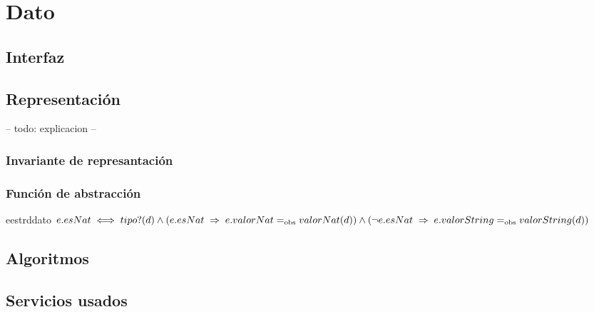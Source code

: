 \section{Dato}

\subsection{Interfaz}

\iusa{}

\ioperaciones

\subsection{Representación}

-- todo: explicacion --


\subsubsection{Invariante de represantación}


\subsubsection{Función de abstracción}

\begin{ABS}{e}{estr}{d}{dato}
    $
    e.esNat \iff tipo?(d) \land \\
    (e.esNat \implies e.valorNat \igobs valorNat(d)) \land \\
    (\neg e.esNat \implies e.valorString \igobs valorString(d))
    $
\end{ABS}

\subsection{Algoritmos}

\subsection{Servicios usados}

